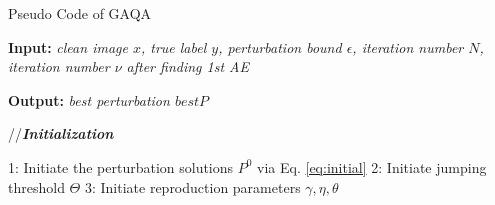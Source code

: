\documentclass[lettersize,journal]{IEEEtran}
\begin{document}
	\begin{algorithm}[t] 
		\caption{Pseudo Code of GAQA}
		\begin{small}
			{\large \textbf{Input:}}\emph{ clean image $x$, true label $y$, perturbation bound $\epsilon$, iteration number $N$, iteration number $\nu$ after finding 1st AE}
			
			{\large \textbf{Output:}} \emph{best perturbation $bestP$}
			
			//\textbf{{\emph{\textcolor[rgb]{0,0,0}{Initialization}}}}		
			\begin{algorithmic}[0]
				\STATE \hspace{-0.3cm} {\small 1:} \hspace{-0.05cm} Initiate the perturbation solutions $P^0$ via Eq. \ref{eq:initial}
				\STATE \hspace{-0.3cm} {\small 2:} \hspace{-0.05cm} Initiate jumping threshold $\Theta$
				\STATE \hspace{-0.3cm} {\small 3:} \hspace{-0.05cm} Initiate reproduction parameters $\gamma, \eta, \theta$
			\end{algorithmic}
			

\end{small}
\end{algorithm}
\end{document}
